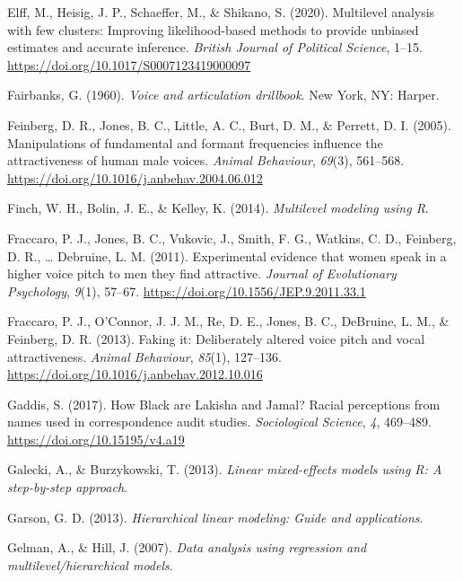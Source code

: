 \documentclass[
  english,
  man, noextraspace,floatsintext]{apa6}
\newlength{\cslhangindent}
\newenvironment{cslreferences}%
  {\setlength{\parindent}{0pt}%
  \everypar{\setlength{\hangindent}{\cslhangindent}}\ignorespaces}%
  {\par}
\begin{document}
\begin{cslreferences}
\leavevmode\hypertarget{ref-Elff2020}{}%
Elff, M., Heisig, J. P., Schaeffer, M., \& Shikano, S. (2020). Multilevel analysis with few clusters: Improving likelihood-based methods to provide unbiased estimates and accurate inference. \emph{British Journal of Political Science}, 1--15. \url{https://doi.org/10.1017/S0007123419000097}

\leavevmode\hypertarget{ref-Fairbanks1960}{}%
Fairbanks, G. (1960). \emph{Voice and articulation drillbook}. New York, NY: Harper.

\leavevmode\hypertarget{ref-Feinberg2005}{}%
Feinberg, D. R., Jones, B. C., Little, A. C., Burt, D. M., \& Perrett, D. I. (2005). Manipulations of fundamental and formant frequencies influence the attractiveness of human male voices. \emph{Animal Behaviour}, \emph{69}(3), 561--568. \url{https://doi.org/10.1016/j.anbehav.2004.06.012}

\leavevmode\hypertarget{ref-Finch2014}{}%
Finch, W. H., Bolin, J. E., \& Kelley, K. (2014). \emph{Multilevel modeling using R}.

\leavevmode\hypertarget{ref-Fraccaro2011}{}%
Fraccaro, P. J., Jones, B. C., Vukovic, J., Smith, F. G., Watkins, C. D., Feinberg, D. R., \ldots{} Debruine, L. M. (2011). Experimental evidence that women speak in a higher voice pitch to men they find attractive. \emph{Journal of Evolutionary Psychology}, \emph{9}(1), 57--67. \url{https://doi.org/10.1556/JEP.9.2011.33.1}

\leavevmode\hypertarget{ref-Fraccaro2013}{}%
Fraccaro, P. J., O'Connor, J. J. M., Re, D. E., Jones, B. C., DeBruine, L. M., \& Feinberg, D. R. (2013). Faking it: Deliberately altered voice pitch and vocal attractiveness. \emph{Animal Behaviour}, \emph{85}(1), 127--136. \url{https://doi.org/10.1016/j.anbehav.2012.10.016}

\leavevmode\hypertarget{ref-Gaddis2017}{}%
Gaddis, S. (2017). How Black are Lakisha and Jamal? Racial perceptions from names used in correspondence audit studies. \emph{Sociological Science}, \emph{4}, 469--489. \url{https://doi.org/10.15195/v4.a19}

\leavevmode\hypertarget{ref-Galecki2013}{}%
Galecki, A., \& Burzykowski, T. (2013). \emph{Linear mixed-effects models using R: A step-by-step approach}.

\leavevmode\hypertarget{ref-Garson2013}{}%
Garson, G. D. (2013). \emph{Hierarchical linear modeling: Guide and applications}.

\leavevmode\hypertarget{ref-Gelman2007}{}%
Gelman, A., \& Hill, J. (2007). \emph{Data analysis using regression and multilevel/hierarchical models}.


\end{cslreferences}
\end{document}

